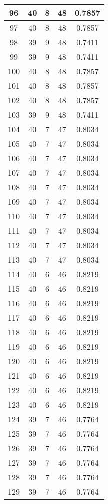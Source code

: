 \documentclass[letterpaper, 12pt]{article}
\begin{document}
\begin{longtable}{|c|c|c|c|c|}
\hline
96 & 40 & 8 & 48 & 0.7857 \\
\hline
97 & 40 & 8 & 48 & 0.7857 \\
\hline
98 & 39 & 9 & 48 & 0.7411 \\
\hline
99 & 39 & 9 & 48 & 0.7411 \\
\hline
100 & 40 & 8 & 48 & 0.7857 \\
\hline
101 & 40 & 8 & 48 & 0.7857 \\
\hline
102 & 40 & 8 & 48 & 0.7857 \\
\hline
103 & 39 & 9 & 48 & 0.7411 \\
\hline
104 & 40 & 7 & 47 & 0.8034 \\
\hline
105 & 40 & 7 & 47 & 0.8034 \\
\hline
106 & 40 & 7 & 47 & 0.8034 \\
\hline
107 & 40 & 7 & 47 & 0.8034 \\
\hline
108 & 40 & 7 & 47 & 0.8034 \\
\hline
109 & 40 & 7 & 47 & 0.8034 \\
\hline
110 & 40 & 7 & 47 & 0.8034 \\
\hline
111 & 40 & 7 & 47 & 0.8034 \\
\hline
112 & 40 & 7 & 47 & 0.8034 \\
\hline
113 & 40 & 7 & 47 & 0.8034 \\
\hline
114 & 40 & 6 & 46 & 0.8219 \\
\hline
115 & 40 & 6 & 46 & 0.8219 \\
\hline
116 & 40 & 6 & 46 & 0.8219 \\
\hline
117 & 40 & 6 & 46 & 0.8219 \\
\hline
118 & 40 & 6 & 46 & 0.8219 \\
\hline
119 & 40 & 6 & 46 & 0.8219 \\
\hline
120 & 40 & 6 & 46 & 0.8219 \\
\hline
121 & 40 & 6 & 46 & 0.8219 \\
\hline
122 & 40 & 6 & 46 & 0.8219 \\
\hline
123 & 40 & 6 & 46 & 0.8219 \\
\hline
124 & 39 & 7 & 46 & 0.7764 \\
\hline
125 & 39 & 7 & 46 & 0.7764 \\
\hline
126 & 39 & 7 & 46 & 0.7764 \\
\hline
127 & 39 & 7 & 46 & 0.7764 \\
\hline
128 & 39 & 7 & 46 & 0.7764 \\
\hline
129 & 39 & 7 & 46 & 0.7764 \\

\end{longtable}
\end{document}
